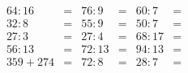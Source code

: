 \documentclass[14pt, a4paper]{extarticle}
\begin{document}
\begin{align*}
    64:16 &=&   76:9 &=&  60:7 &=\\
    32:8  &=&   55:9 &=&  50:7 &=\\
    27:3  &=&   27:4 &=&  68:17 &=\\
    56:13 &=&   72:13 &=& 94:13 &=\\
    359+274 &=& 72:8  &=& 28:7  &=
\end{align*}
\end{document}
